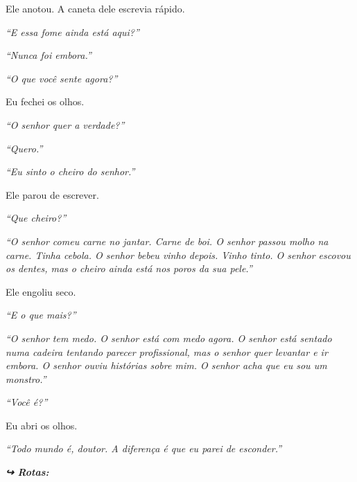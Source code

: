 \noindent Ele anotou. A caneta dele escrevia rápido.

\noindent \textit{\textquotedblleft{}E essa fome ainda está aqui?\textquotedblright{}}

\noindent \textit{\textquotedblleft{}Nunca foi embora.\textquotedblright{}}

\noindent \textit{\textquotedblleft{}O que você sente agora?\textquotedblright{}}

\noindent Eu fechei os olhos.

\noindent \textit{\textquotedblleft{}O senhor quer a verdade?\textquotedblright{}}

\noindent \textit{\textquotedblleft{}Quero.\textquotedblright{}}

\noindent \textit{\textquotedblleft{}Eu sinto o cheiro do senhor.\textquotedblright{}}

\noindent Ele parou de escrever.

\noindent \textit{\textquotedblleft{}Que cheiro?\textquotedblright{}}

\noindent \textit{\textquotedblleft{}O senhor comeu carne no jantar. Carne de boi. O senhor passou molho na carne. Tinha cebola. O senhor bebeu vinho depois. Vinho tinto. O senhor escovou os dentes, mas o cheiro ainda está nos poros da sua pele.\textquotedblright{}}

\noindent Ele engoliu seco.

\noindent \textit{\textquotedblleft{}E o que mais?\textquotedblright{}}

\noindent \textit{\textquotedblleft{}O senhor tem medo. O senhor está com medo agora. O senhor está sentado numa cadeira tentando parecer profissional, mas o senhor quer levantar e ir embora. O senhor ouviu histórias sobre mim. O senhor acha que eu sou um monstro.\textquotedblright{}}

\noindent \textit{\textquotedblleft{}Você é?\textquotedblright{}}

\noindent Eu abri os olhos.

\noindent \textit{\textquotedblleft{}Todo mundo é, doutor. A diferença é que eu parei de esconder.\textquotedblright{}}

\vspace{0.5em}
\noindent\textit{\textbf{↪ Rotas:}  \rotasep {} \rotasep {}}